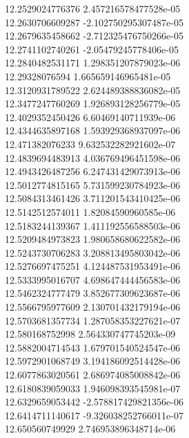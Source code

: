 {12.2529024776376 2.457216578477528e-05 \\
12.2630706609287 -2.102750295307487e-05 \\
12.2679635458662 -2.712325476750266e-05 \\
12.2741102740261 -2.05479245778406e-05 \\
12.2840482531171 1.298351207879023e-06 \\
12.29328076594 1.665659146965481e-05 \\
12.3120931789522 2.624489388836082e-05 \\
12.3477247760269 1.926893128256779e-05 \\
12.4029352450426 6.60469140711939e-06 \\
12.4344635897168 1.593929368937097e-06 \\
12.471382076233 9.632532282921602e-07 \\
12.4839694483913 4.036769496451598e-06 \\
12.4943426487256 6.247431429073913e-06 \\
12.5012774815165 5.731599230784923e-06 \\
12.5084313461426 3.711201543410425e-06 \\
12.5142512574011 1.82084590960585e-06 \\
12.5183244139367 1.411192556588503e-06 \\
12.5209484973823 1.980658680622582e-06 \\
12.5243730706283 3.208813495803042e-06 \\
12.5276697475251 4.124487531953491e-06 \\
12.5333995016707 4.698647444456583e-06 \\
12.5462324777479 3.852677309623687e-06 \\
12.5566795977609 2.130701432179194e-06 \\
12.5703681357734 1.287058353227621e-07 \\
12.580168752998 2.564330747745203e-09 \\
12.5882004714543 1.679701540524547e-06 \\
12.5972901068749 3.194186092514428e-06 \\
12.6077863020561 2.686974085008842e-06 \\
12.6180839059033 1.946098393545981e-07 \\
12.6329659053442 -2.578817429821356e-06 \\
12.6414711140617 -9.326038252766011e-07 \\
12.650560749929 2.746953896348714e-06 \\
}
